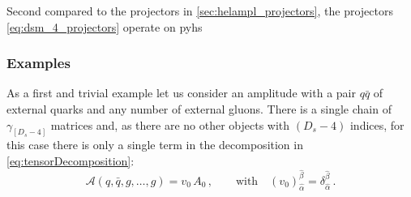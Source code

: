 Second compared to the projectors in \cref{sec:helampl_projectors}, the projectors \cref{eq:dsm_4_projectors}
operate on pyhs



\subsubsection{Examples}

As a first and trivial example let us consider an amplitude with a pair $q\bar q$ of external
quarks and any number of external gluons. There is a single
chain of $\gamma_{[D_s-4]}$ matrices and, as there are no other objects with $(D_s-4)$ indices,
for this case there is only a single term in the decomposition in \cref{eq:tensorDecomposition}:
\begin{equation}\label{eq:decompqqbar}
  \mathcal{A}(q,\bar q,g,\ldots,g) =v_0\,A_0\,,\qquad \textrm{with}\quad (v_0)_{\hat{\alpha}}^{\hat{\beta}}=\delta_{\hat{\alpha}}^{\hat{\beta}}\,.
\end{equation}

